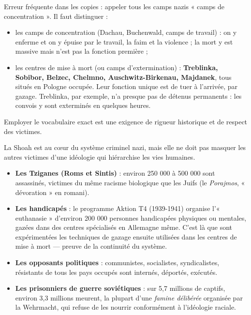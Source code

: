 \documentclass[11pt]{article}
\newcommand{\cle}[1]{{\popxbold\color{popdark}#1}}
\newcounter{popsec}
\newcounter{popsub}
\newcommand{\courssub}[1]{%
  \stepcounter{popsub}%
  \par\vspace{9pt}\noindent{\popxbold\fontsize{11.5}{13}\selectfont\color{popink}{\color{poporange}\thepopsec.\thepopsub}\hspace{6pt}#1}\par\nopagebreak\vspace{4pt}
}
\begin{document}
\begin{attention}
Erreur fréquente dans les copies : appeler tous les camps nazis « camps de concentration ». Il faut distinguer :
\begin{itemize}
\item les \cle{camps de concentration} (Dachau, Buchenwald, camps de travail) : on y enferme et on y épuise par le travail, la faim et la violence ; la mort y est massive mais n'est pas la fonction première ;
\item les \cle{centres de mise à mort} (ou camps d'extermination) : \textbf{Treblinka, Sobibor, Belzec, Chelmno, Auschwitz-Birkenau, Majdanek}, tous situés en Pologne occupée. Leur fonction unique est de tuer à l'arrivée, par gazage. Treblinka, par exemple, n'a presque pas de détenus permanents : les convois y sont exterminés en quelques heures.
\end{itemize}
Employer le vocabulaire exact est une exigence de rigueur historique et de respect des victimes.
\end{attention}

\courssub{Les autres crimes de masse du nazisme}

La Shoah est au cœur du système criminel nazi, mais elle ne doit pas masquer les autres victimes d'une idéologie qui hiérarchise les vies humaines.

\begin{itemize}
\item \textbf{Les Tziganes (Roms et Sintis)} : environ 250 000 à 500 000 sont assassinés, victimes du même racisme biologique que les Juifs (le \emph{Porajmos}, « dévoration » en romani).
\item \textbf{Les handicapés} : le programme \cle{Aktion T4} (1939-1941) organise l'« euthanasie » d'environ 200 000 personnes handicapées physiques ou mentales, gazées dans des centres spécialisés en Allemagne même. C'est là que sont expérimentées les techniques de gazage ensuite utilisées dans les centres de mise à mort — preuve de la continuité du système.
\item \textbf{Les opposants politiques} : communistes, socialistes, syndicalistes, résistants de tous les pays occupés sont internés, déportés, exécutés.
\item \textbf{Les prisonniers de guerre soviétiques} : sur 5,7 millions de captifs, environ 3,3 millions meurent, la plupart d'une \emph{famine délibérée} organisée par la Wehrmacht, qui refuse de les nourrir conformément à l'idéologie raciale.
\end{itemize}
\end{document}
